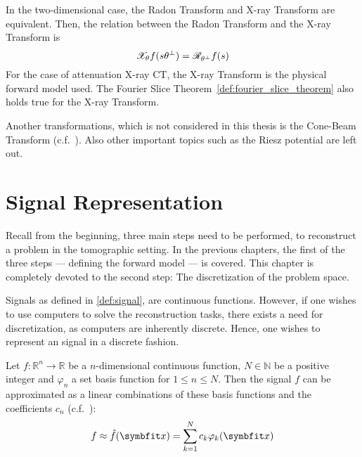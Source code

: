 In the two-dimensional case, the Radon Transform and X-ray Transform are equivalent.
Then, the relation between the Radon Transform and the X-ray Transform is
\[\mathscr{X}_\theta f(s\theta^\perp) = \mathscr{R}_{\theta^\perp} f(s)\]
For the case of attenuation X-ray CT, the X-ray Transform is the physical forward model used. The
Fourier Slice Theorem~\ref{def:fourier_slice_theorem} also holds true for the X-ray Transform.

Another transformations, which is not considered in this thesis is the Cone-Beam Transform
(c.f.~\cite[Chapter~2]{carpio_inverse_2008}). Also other important topics such as the Riesz
potential are left out.

\chapter{Signal Representation}\label{chap:signal_representation}

Recall from the beginning, three main steps need to be performed, to reconstruct a problem in the
tomographic setting. In the previous chapters, the first of the three steps --- defining the forward
model --- is covered. This chapter is completely devoted to the second step: The discretization of
the problem space.

Signals as defined in \autoref{def:signal}, are continuous functions. However, if one wishes to use
computers to solve the reconstruction tasks, there exists a need for discretization, as computers
are inherently discrete. Hence, one wishes to represent an signal in a discrete fashion.

\begin{definition}\label{def:permissible_representation}
	Let \(f\colon \mathbb{R}^n \to \mathbb{R}\) be a \(n\)-dimensional continuous function,
	\(N \in \mathbb{N}\) be a positive integer and \(\varphi_n\) a set basis function for
	\(1 \leq n \leq N\). Then the signal \(f\) can be approximated as a linear combinations
	of these basis functions and the coefficients \(c_n\) (c.f.\ \cite{herman_basis_2015}):
	\[ f \approx \near{f}(\mvec{x}) = \sum_{k=1}^{N} c_k \varphi_k(\mvec{x}) \]
\end{definition}

